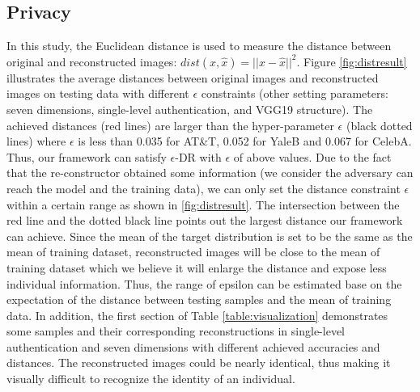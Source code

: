 \subsection{Privacy}
In this study, the Euclidean distance is used to measure the distance between original and reconstructed images: $dist(x,\hat{x}) = ||x-\hat{x}||^2$. Figure \ref{fig:distresult} illustrates the average distances between original images and reconstructed images on testing data with different $\epsilon$ constraints (other setting parameters: seven dimensions, single-level authentication, and VGG19 structure). The achieved distances (red lines) are larger than the hyper-parameter $\epsilon$ (black dotted lines) where $\epsilon$ is less than 0.035 for AT\&T, 0.052 for YaleB and 0.067 for CelebA. Thus, our framework can satisfy $\epsilon$-DR with $\epsilon$ of above values. Due to the fact that the re-constructor obtained some information (we consider the adversary can reach the model and the training data), we can only set the distance constraint $\epsilon$ within a certain range as shown in \ref{fig:distresult}. The intersection between the red line and the dotted black line points out the largest distance our framework can achieve. Since the mean of the target distribution is set to be the same as the mean of training dataset, reconstructed images will be close to the mean of training dataset which we believe it will enlarge the distance and expose less individual information. Thus, the range of epsilon can be estimated base on the expectation of the distance between testing samples and the mean of training data. In addition, the first section of Table \ref{table:visualization} demonstrates some samples and their corresponding reconstructions in single-level authentication and seven dimensions with different achieved accuracies and distances. The reconstructed images could be nearly identical, thus making it visually difficult to recognize the identity of an individual.      
 
